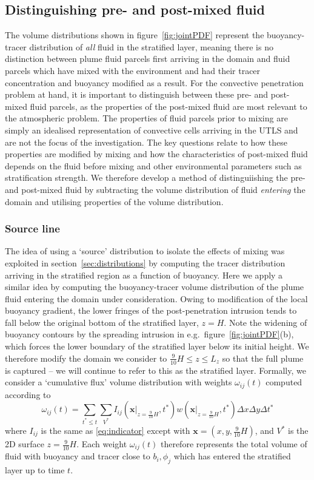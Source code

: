 \documentclass[a4paper]{article}
\begin{document}
\subsection{Distinguishing pre- and post-mixed fluid}
\label{sec:jointPDF}

The volume distributions shown in figure~\ref{fig:jointPDF} represent the buoyancy-tracer distribution of
\emph{all} fluid in the stratified layer, meaning there is no distinction between plume fluid parcels first
arriving in the domain and fluid parcels which have mixed with the environment and had their tracer
concentration and buoyancy modified as a result. For the convective penetration problem at hand, it is
important to distinguish between these pre- and post-mixed fluid parcels, as the properties of the post-mixed
fluid are most relevant to the atmospheric problem. The properties of fluid parcels prior to mixing are simply
an idealised representation of convective cells arriving in the UTLS and are not the focus of the
investigation. The key questions relate to how these properties are modified by mixing and how the
characteristics of post-mixed fluid depends on the fluid before mixing and other environmental parameters such
as stratification strength. We therefore develop a method of distinguiishing the pre- and post-mixed fluid by
subtracting the volume distribution of fluid \emph{entering} the domain and utilising properties of
the volume distribution.

\subsubsection{Source line}
The idea of using a `source' distribution to isolate the effects of mixing was exploited in
section~\ref{sec:distributions} by computing the tracer distribution arriving in the stratified region as a
function of buoyancy. Here we apply a similar idea by computing the buoyancy-tracer volume distribution of the
plume fluid entering the domain under consideration. Owing to modification of the local buoyancy gradient,
the lower fringes of the post-penetration intrusion tends to fall below the original bottom of the stratified
layer, $z=H$. Note the widening of buoyancy contours by the spreading intrusion in e.g.\
figure~\ref{fig:jointPDF}(b), which forces the lower boundary of the stratified layer below its initial
height. We therefore modify the domain we consider to $\frac{9}{10}H \le z \le L_z$ so that the full plume is
captured -- we will continue to refer to this as the stratified layer. Formally, we consider a `cumulative
flux' volume distribution with weights $\omega_{ij}(t)$ computed according to
\begin{equation}
	\omega_{ij}(t) = \sum_{t^* \le t} \sum_{V^*} I_{ij}(\left.\bm{x}\right|_{z=\frac{9}{10}H}, t^*)
		w(\left.\bm{x}\right|_{z=\frac{9}{10}H}, t^*) \Delta x \Delta y \Delta t^*
\end{equation}
where $I_{ij}$ is the same as \eqref{eq:indicator} except with $\bm{x} = (x, y, \frac{9}{10}H)$, and $V^*$ is
the 2D surface $z=\frac{9}{10}H$. Each weight $\omega_{ij}(t)$ therefore represents the total volume of fluid
with buoyancy and tracer close to $b_i, \phi_j$ which has entered the stratified layer up to time $t$.
\end{document}
